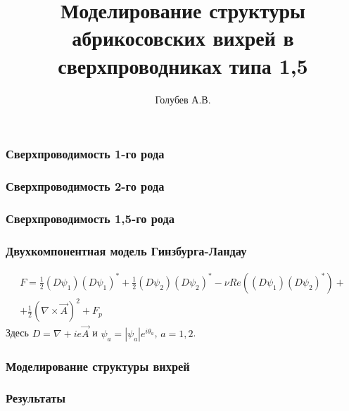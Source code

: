 \title{Моделирование структуры абрикосовских вихрей в сверхпроводниках 
    типа 1,5}
\author{Голубев А.В.}
\date{}

\begin{frame}
    \titlepage
\end{frame}

\begin{frame}
    \frametitle{Сверхпроводимость 1-го рода}
\end{frame}

\begin{frame}
    \frametitle{Сверхпроводимость 2-го рода}
\end{frame}

\begin{frame}
    \frametitle{Сверхпроводимость 1,5-го рода}
\end{frame}

\begin{frame}
    \frametitle{Двухкомпонентная модель Гинзбурга-Ландау}
    \begin{gather}
        F = \frac{1}{2}(D\psi_1)(D\psi_1)^* + 
            \frac{1}{2}(D\psi_2)(D\psi_2)^* -
            \nu Re\left( (D\psi_1)(D\psi_2)^* \right) + \nonumber \\ +
            \frac{1}{2}\left(\nabla\times\vec{A}\right)^2 + F_p
    \end{gather}
    Здесь \( D = \nabla + ie\vec{A} \) и \( \psi_a = |\psi_a|e^{i\theta_a} \), 
    \( a = 1,2 \).
\end{frame}

\begin{frame}
    \frametitle{Моделирование структуры вихрей}
\end{frame}

\begin{frame}
    \frametitle{Результаты}
\end{frame}